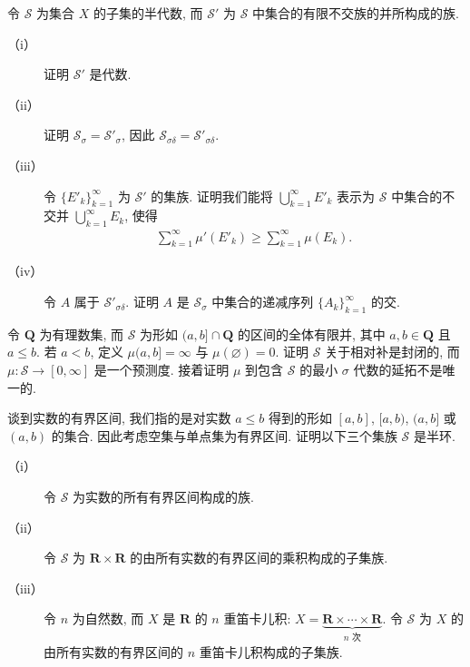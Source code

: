 \documentclass[../../main.tex]{subfiles}
\begin{document}
\begin{exercise}\label{exercise:ch17-31}
令 $\mathcal{S}$ 为集合 $X$ 的子集的半代数, 而 $\mathcal{S}'$ 为 $\mathcal{S}$ 中集合的有限不交族的并所构成的族.
\begin{description}
\item[（i）] 证明 $\mathcal{S}'$ 是代数.
\item[（ii）] 证明 $\mathcal{S}_{\sigma}=\mathcal{S}'_{\sigma}$, 因此 $\mathcal{S}_{\sigma\delta}=\mathcal{S}'_{\sigma\delta}$.
\item[（iii）] 令 $\{E'_{k}\}_{k=1}^{\infty}$ 为 $\mathcal{S}'$ 的集族. 证明我们能将 $\bigcup_{k=1}^{\infty}E'_{k}$ 表示为 $\mathcal{S}$ 中集合的不交并 $\bigcup_{k=1}^{\infty}E_{k}$, 使得
\begin{align*}
\sum_{k=1}^{\infty}\mu'(E'_{k})\geqslant\sum_{k=1}^{\infty}\mu(E_{k}).
\end{align*}
\item[（iv）] 令 $A$ 属于 $\mathcal{S}'_{\sigma\delta}$. 证明 $A$ 是 $\mathcal{S}_{\sigma}$ 中集合的递减序列 $\{A_{k}\}_{k=1}^{\infty}$ 的交.
\end{description}
\end{exercise}

\begin{exercise}\label{exercise:ch17-32}
令 $\mathbf{Q}$ 为有理数集, 而 $\mathcal{S}$ 为形如 $(a,b]\cap\mathbf{Q}$ 的区间的全体有限并, 其中 $a,b\in\mathbf{Q}$ 且 $a\leqslant b$. 若 $a<b$, 定义 $\mu(a,b]=\infty$ 与 $\mu(\varnothing)=0$. 证明 $\mathcal{S}$ 关于相对补是封闭的, 而 $\mu:\mathcal{S}\to[0,\infty]$ 是一个预测度. 接着证明 $\mu$ 到包含 $\mathcal{S}$ 的最小 $\sigma$ 代数的延拓不是唯一的.
\end{exercise}

\begin{exercise}\label{exercise:ch17-33}
谈到实数的有界区间, 我们指的是对实数 $a\leqslant b$ 得到的形如 $[a,b]$, $[a,b)$, $(a,b]$ 或 $(a,b)$ 的集合. 因此考虑空集与单点集为有界区间. 证明以下三个集族 $\mathcal{S}$ 是半环.
\begin{description}
\item[（i）] 令 $\mathcal{S}$ 为实数的所有有界区间构成的族.
\item[（ii）] 令 $\mathcal{S}$ 为 $\mathbf{R}\times\mathbf{R}$ 的由所有实数的有界区间的乘积构成的子集族.
\item[（iii）] 令 $n$ 为自然数, 而 $X$ 是 $\mathbf{R}$ 的 $n$ 重笛卡儿积: $X=\underbrace{\mathbf{R}\times\cdots\times\mathbf{R}}_{n\text{ 次}}$. 令 $\mathcal{S}$ 为 $X$ 的由所有实数的有界区间的 $n$ 重笛卡儿积构成的子集族.
\end{description}
\end{exercise}
\end{document}
